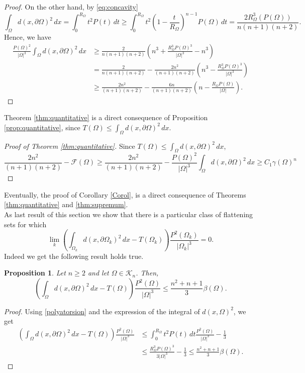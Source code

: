 \documentclass[oneside,a4paper,11pt,notitlepage]{article}
\newcommand{\abs}[1]{{\left|#1\right|}}
\theoremstyle{definition}
\theoremstyle{plain}
\newtheorem{prop}[teorema]{Proposition}
\theoremstyle{definition}
\begin{document}
\begin{proof}
On the other hand, by \eqref{eq:concavity}
$$\int_{\Omega} d(x,\partial\Omega)^2\, dx = \int_{0}^{R_\Omega} t^2 P(t)\, dt \geq \int_{0}^{R_\Omega} t^2 \left(1- \frac{t}{R_\Omega}\right)^{n-1}P(\Omega)\, dt = \frac{2R_{\Omega}^3(P(\Omega))}{n(n+1)(n+2)}.$$
Hence, we have
\begin{equation*}
\begin{aligned}
    \frac{P(\Omega)^2}{\abs{\Omega}^3}\int_{\Omega} d(x,\partial\Omega)^2\, dx &\geq \frac{2}{n(n+1)(n+2)} \left(n^3+\frac{R^3_{\Omega}P(\Omega)^3}{\abs{\Omega}^3}-n^3\right)\\
    &= \frac{2}{n(n+1)(n+2)} - \frac{2n^2}{(n+1)(n+2)}\left( n^3 -\frac{R^3_{\Omega}P(\Omega)^3}{\abs{\Omega}^3}\right)\\
    &\geq \frac{2n^2}{(n+1)(n+2)} - \frac{6n}{(n+1)(n+2)}\left( n-\frac{R_{\Omega}P(\Omega)}{\abs{\Omega}}\right).
    \end{aligned}
\end{equation*}
\end{proof}

 Theorem \ref{thm:quantitative} is a direct consequence of Proposition \ref{prop:quantitative}, since $T(\Omega) \leq \int_{\Omega} d(x,\partial\Omega)^2\, dx$.

 \begin{proof}[Proof of Theorem \ref{thm:quantitative}]
 Since $T(\Omega) \leq \int_{\Omega} d(x,\partial\Omega)^2\, dx$,
$$ \frac{2n^2}{(n+1)(n+2)}-\mathcal{F}(\Omega) \geq \frac{2n^2}{(n+1)(n+2)}-\frac{P(\Omega)^2}{\abs{\Omega}^3} \int_{\Omega} d(x, \partial \Omega)^2 \, dx \geq C_1\gamma(\Omega)^n$$
 \end{proof}
\noindent Eventually, the proof of Corollary \ref{Corol}, is a direct consequence of Theorems \ref{thm:quantitative} and \ref{thm:supremum}.\\
As last result of this section we show that there is a particular class of flattening sets for which $$\lim_k \left(\int_{\Omega_k}d(x,\partial \Omega_k)^2\,dx - T(\Omega_k)\right)\frac{P^2(\Omega_k)}{\abs{\Omega_k}^3}=0.$$
Indeed we get the following result holds true.

\begin{prop}Let $n\ge 2$ and let $\Omega \in \mathcal{K}_n$. Then,
    $$\left(\int_{\Omega}d(x,\partial \Omega)^2\,dx - T(\Omega)\right)\frac{P^2(\Omega)}{\abs{\Omega}^3}  \leq \frac{n^2+n+1}{3} \beta(\Omega).$$
\end{prop}
\begin{proof} Using \eqref{polyatorsion} and the expression of the integral of $d(x,\Omega)^2$, we get
$$\begin{aligned}
    \left(\int_{\Omega}d(x,\partial \Omega)^2\,dx - T(\Omega)\right)\frac{P^2(\Omega)}{\abs{\Omega}^3}  &\leq \int_0^{R_\Omega} t^2 P(t)\, dt \frac{P^2(\Omega)}{\abs{\Omega}^3} -\frac1 3 \\&\leq \frac{R_\Omega^3 P(\Omega)^3}{3\abs{\Omega}^3}  - \frac 1 3\leq  \frac{n^2+n+1}{3} \beta(\Omega). 
\end{aligned}$$
\end{proof}
\end{document}
